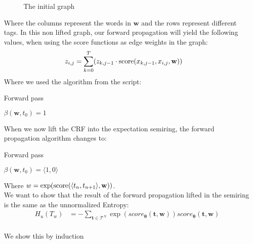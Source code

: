 \documentclass[a4paper,12pt]{ETHexercise}
\begin{document}
\begin{question}
\begin{subquestion}
\begin{figure}[H]
\begin{tikzpicture}[node distance={20mm}, thick, main/.style = {draw, circle}]
      \end{tikzpicture}
      \caption[]{The initial graph}
    \end{figure}
    Where the columns represent the words in $\mathbf{w}$ and the rows represent different tags.
    In this non lifted graph, our forward propagation will yield the following values, when using the score functions as edge weights in the graph:
    \begin{align}
      z_{i,j} & = \sum_{k=0}^{T} (z_{k,j-1} \cdot \score{x_{k, j-1}}{x_{i,j}})
    \end{align}
    Where we used the algorithm from the script:
    \begin{algorithm}
      \SetAlgoLined
      \caption{Forward pass}
      \label{algo:forward}
      $\beta(\mathbf{w}, t_0) = 1$\\
    \end{algorithm}
    When we now lift the CRF into the expectation semiring, the forward propagation algorithm changes to:\\
    \begin{algorithm}[H]
      \SetAlgoLined
      \caption{Forward pass}
      \label{algo:forward_semi}
      $\beta(\mathbf{w}, t_0) = \langle 1, 0 \rangle$\\
    \end{algorithm}
    Where $w = \exp(\score{\langle t_n}{t_{n+1}\rangle})$.\\
    We want to show that the result of the forward propagation lifted in the semiring is the same as the unnormalized Entropy:
    \begin{align}
      H_u(T_{w}) & = -\sum_{\mathbf{t} \in \mathcal{T}^N} \exp(score_{\boldsymbol{\theta}} (\mathbf{t},\boldsymbol{w})) score_{\boldsymbol{\theta}} (\mathbf{t},\boldsymbol{w}) \\
    \end{align}

    We show this by induction
  \end{subquestion}
\end{question}
\end{document}
